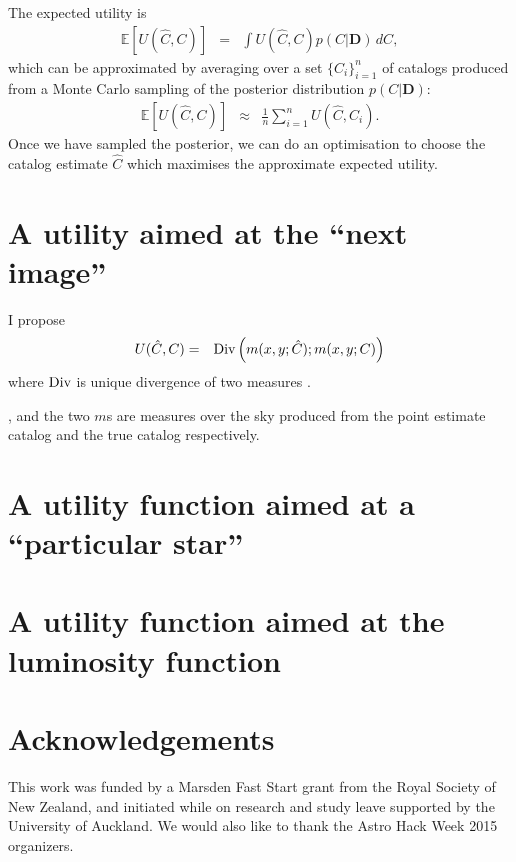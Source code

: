\documentclass[a4paper,fleqn,usenatbib]{mnras}
\newcommand{\data}{\boldsymbol{D}}
\begin{document}
The expected utility is
\begin{eqnarray}
\mathds{E}\left[U(\hat{C}, C)\right]
&=&
\int U(\hat{C}, C) p(C | \data) \, dC,
\end{eqnarray}
which can be approximated by averaging over a set $\{C_i\}_{i=1}^n$
of catalogs produced from a Monte Carlo sampling of the posterior distribution
$p(C|\data)$:
\begin{eqnarray}
\mathds{E}\left[U(\hat{C}, C)\right]
&\approx&
\frac{1}{n} \sum_{i=1}^n U(\hat{C}, C_i).
\end{eqnarray}
Once we have sampled the posterior, we can do an optimisation to choose the
catalog estimate $\hat{C}$ which maximises the approximate expected utility.

\section{A utility aimed at the ``next image''}

I propose
\begin{eqnarray}
U(\hat{C}, C) &=& \textnormal{Div}\left(m(x, y; \hat{C}); m(x, y; C)\right)
\end{eqnarray}
where $\textnormal{Div}$ is unique divergence of
two measures \citep{knuth2012foundations}.

, and the two $m$s are measures over the sky produced from the
point estimate catalog and the true catalog respectively.


\section{A utility function aimed at a ``particular star''}


\section{A utility function aimed at the luminosity function}



\section*{Acknowledgements}
This work was funded by a Marsden Fast Start grant from the Royal Society of
New Zealand, and initiated while on research and study leave supported by
the University of Auckland. We would also like to thank the Astro Hack Week
2015 organizers.

\end{document}
